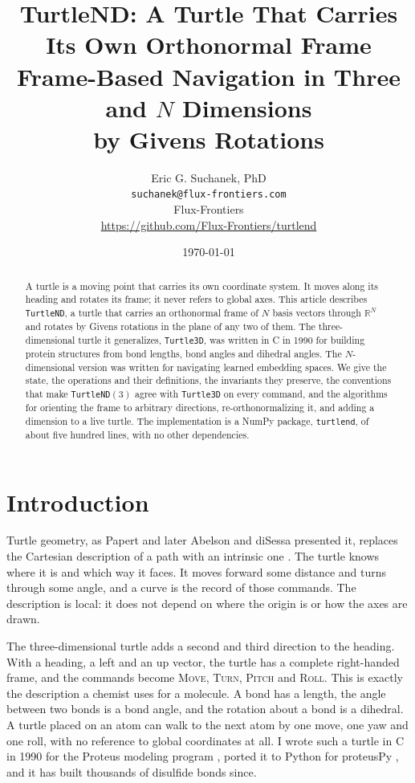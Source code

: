 \documentclass[11pt,letterpaper]{article}
\title{%
  \textbf{TurtleND: A Turtle That Carries Its Own Orthonormal Frame} \\[6pt]
  \large Frame-Based Navigation in Three and $N$ Dimensions \\
  by Givens Rotations
}
\author{
  Eric G. Suchanek, PhD \\
  \texttt{suchanek@flux-frontiers.com} \\[4pt]
  Flux-Frontiers \\
  \url{https://github.com/Flux-Frontiers/turtlend}
}
\date{\today}
\newcommand{\R}{\mathbb{R}}
\newcommand{\code}[1]{\texttt{#1}}
\newcommand{\op}[1]{\textup{\textsc{#1}}}
\begin{document}
\maketitle

\begin{abstract}
A turtle is a moving point that carries its own coordinate system. It
moves along its heading and rotates its frame; it never refers to global
axes. This article describes \code{TurtleND}, a turtle that carries an
orthonormal frame of $N$ basis vectors through $\R^N$ and rotates by
Givens rotations in the plane of any two of them. The three-dimensional
turtle it generalizes, \code{Turtle3D}, was written in C in 1990 for
building protein structures from bond lengths, bond angles and dihedral
angles. The $N$-dimensional version was written for navigating learned
embedding spaces. We give the state, the operations and their
definitions, the invariants they preserve, the conventions that make
\code{TurtleND}$(3)$ agree with \code{Turtle3D} on every command, and
the algorithms for orienting the frame to arbitrary directions,
re-orthonormalizing it, and adding a dimension to a live turtle. The
implementation is a NumPy package, \code{turtlend}, of about five hundred
lines, with no other dependencies.
\end{abstract}

\tableofcontents
\newpage

\section{Introduction}
\label{sec:intro}

Turtle geometry, as Papert and later Abelson and diSessa presented it,
replaces the Cartesian description of a path with an intrinsic one
\citep{papert1980mindstorms, abelson1981turtle}. The turtle knows where
it is and which way it faces. It moves forward some distance and turns
through some angle, and a curve is the record of those commands. The
description is local: it does not depend on where the origin is or how
the axes are drawn.

The three-dimensional turtle adds a second and third direction to the
heading. With a heading, a left and an up vector, the turtle has a
complete right-handed frame, and the commands become \op{Move},
\op{Turn}, \op{Pitch} and \op{Roll}. This is exactly the
description a chemist uses for a molecule. A bond has a length, the
angle between two bonds is a bond angle, and the rotation about a bond
is a dihedral. A turtle placed on an atom can walk to the next atom by
one move, one yaw and one roll, with no reference to global coordinates
at all. I wrote such a turtle in C in 1990 for the Proteus modeling
program \citep{pabo1986computer}, ported it to Python for proteusPy
\citep{suchanek2024proteuspy, suchanek2026disulfide}, and it has built
thousands of disulfide bonds since.
\end{document}
